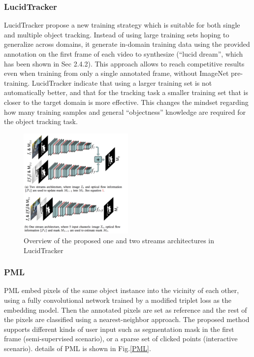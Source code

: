 \subsubsection{LucidTracker}
LucidTracker\cite{LucidTracker} propose a new training strategy which is suitable for both single and multiple object tracking. Instead of using large training sets hoping to generalize across domains, it generate in-domain training data using the provided annotation on the ﬁrst frame of each video to synthesize (``lucid dream'', which has been shown in Sec 2.4.2). This approach allows to reach competitive results even when training from only a single annotated frame, without ImageNet pre-training. LucidTracker indicate that using a larger training set is not automatically better, and that for the tracking task a smaller training set that is closer to the target domain is more effective. This changes the mindset regarding how many training samples and general ``objectness'' knowledge are required for the object tracking task.

\begin{figure}[ht]
    \centering
    \includegraphics[width=0.5\textwidth]{./figure/lucid_tracker.png}
    \caption{Overview of the proposed one and two streams architectures in LucidTracker}
    \label{lucid_tracker}
\end{figure}

\subsubsection{PML}
PML\cite{PML} embed pixels of the same object instance into the vicinity of each other, using a fully convolutional network trained by a modiﬁed triplet loss as the embedding model. Then the annotated pixels are set as reference and the rest of the pixels are classiﬁed using a nearest-neighbor approach. The proposed method supports different kinds of user input such as segmentation mask in the ﬁrst frame (semi-supervised scenario), or a sparse set of clicked points (interactive scenario). details of PML is shown in Fig.\ref{PML}.

